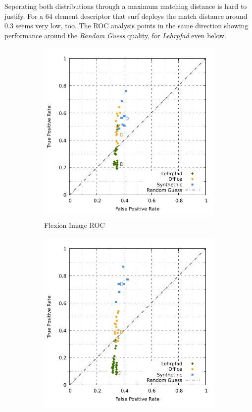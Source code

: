 Seperating both distributions through a maximum matching distance is hard to justify.
For a 64 element descriptor that \acrshort{surf} deploys the match distance around \num{0.3} seems very low, too.
The ROC analysis points in the same direction showing performance around the \emph{Random Guess} quality, for \emph{Lehrpfad} even below.
\begin{figure}[htp]
\begin{subfigure}[t]{0.45\linewidth}
    \includegraphics[width=\linewidth]{chapter06/results/SURF/flexion/roc.pdf}%
    \caption{Flexion Image ROC}
\end{subfigure}\quad
\begin{subfigure}[t]{0.45\linewidth}
    \includegraphics[width=\linewidth]{chapter06/results/SURF/bearing/roc.pdf}

\end{subfigure}
\end{figure}
